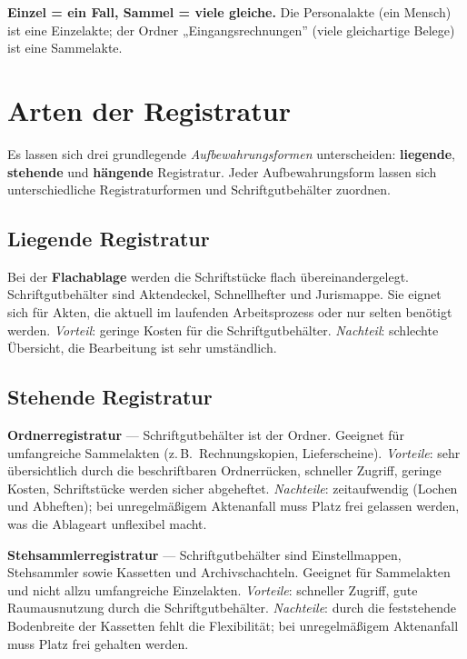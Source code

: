 \documentclass[11pt, a4paper]{article}
\begin{document}
\begin{eselsbruecke}
\textbf{Einzel = ein Fall, Sammel = viele gleiche.} Die Personalakte (ein Mensch) ist
eine Einzelakte; der Ordner „Eingangsrechnungen” (viele gleichartige Belege) ist eine
Sammelakte.
\end{eselsbruecke}

\section{Arten der Registratur}

Es lassen sich drei grundlegende \emph{Aufbewahrungsformen} unterscheiden:
\textbf{liegende}, \textbf{stehende} und \textbf{hängende} Registratur. Jeder
Aufbewahrungsform lassen sich unterschiedliche Registraturformen und Schriftgutbehälter
zuordnen.

\subsection{Liegende Registratur}

Bei der \textbf{Flachablage} werden die Schriftstücke flach übereinandergelegt.
Schriftgutbehälter sind Aktendeckel, Schnellhefter und Jurismappe. Sie eignet sich für
Akten, die aktuell im laufenden Arbeitsprozess oder nur selten benötigt werden.
\emph{Vorteil}: geringe Kosten für die Schriftgutbehälter. \emph{Nachteil}: schlechte
Übersicht, die Bearbeitung ist sehr umständlich.

\subsection{Stehende Registratur}

\textbf{Ordnerregistratur} --- Schriftgutbehälter ist der Ordner. Geeignet für
umfangreiche Sammelakten (z.\,B.\ Rechnungskopien, Lieferscheine). \emph{Vorteile}: sehr
übersichtlich durch die beschriftbaren Ordnerrücken, schneller Zugriff, geringe Kosten,
Schriftstücke werden sicher abgeheftet. \emph{Nachteile}: zeitaufwendig (Lochen und
Abheften); bei unregelmäßigem Aktenanfall muss Platz frei gelassen werden, was die
Ablageart unflexibel macht.

\textbf{Stehsammlerregistratur} --- Schriftgutbehälter sind Einstellmappen, Stehsammler
sowie Kassetten und Archivschachteln. Geeignet für Sammelakten und nicht allzu
umfangreiche Einzelakten. \emph{Vorteile}: schneller Zugriff, gute Raumausnutzung durch
die Schriftgutbehälter. \emph{Nachteile}: durch die feststehende Bodenbreite der
Kassetten fehlt die Flexibilität; bei unregelmäßigem Aktenanfall muss Platz frei
gehalten werden.
\end{document}
